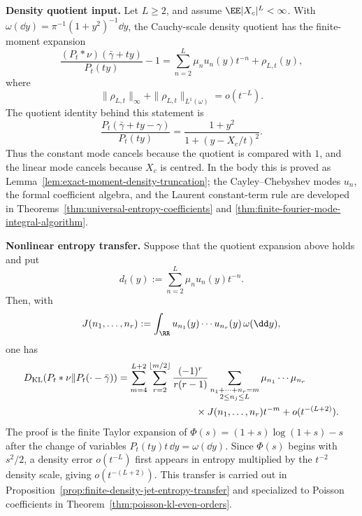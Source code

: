 \medskip
\noindent\textbf{Density quotient input.}
Let \(L\ge2\), and assume \(\EE|X_c|^L<\infty\).  With
\(\omega(\dd y)=\pi^{-1}(1+y^2)^{-1}\dd y\), the Cauchy-scale density
quotient has the finite-moment expansion
\begin{equation}\label{eq:guide-theorem-a-density-quotient}
\frac{(P_t*\nu)(\bar{\gamma}+ty)}{P_t(ty)}-1
=
\sum_{n=2}^{L}\mu_nu_n(y)t^{-n}+\rho_{L,t}(y),
\end{equation}
where
\begin{equation}\label{eq:guide-theorem-a-density-remainder}
\|\rho_{L,t}\|_\infty+\|\rho_{L,t}\|_{L^1(\omega)}=o(t^{-L}).
\end{equation}
The quotient identity behind this statement is
\[
\frac{P_t(\bar{\gamma}+ty-\gamma)}{P_t(ty)}
=\frac{1+y^2}{1+(y-X_c/t)^2}.
\]
Thus the constant mode cancels because the quotient is compared with \(1\),
and the linear mode cancels because \(X_c\) is centred.  In the body this is
proved as Lemma~\ref{lem:exact-moment-density-truncation}; the
Cayley--Chebyshev modes \(u_n\), the formal coefficient algebra, and the
Laurent constant-term rule are developed in
Theorems~\ref{thm:universal-entropy-coefficients} and
\ref{thm:finite-fourier-mode-integral-algorithm}.

\medskip
\noindent\textbf{Nonlinear entropy transfer.}
Suppose that the quotient expansion above holds and put
\[
d_t(y):=\sum_{n=2}^{L}\mu_nu_n(y)t^{-n}.
\]
Then, with
\[
J(n_1,\ldots,n_r):=
\int_{\RR}u_{n_1}(y)\cdots u_{n_r}(y)\,\omega(\dd y),
\]
one has
\begin{equation}\label{eq:guide-theorem-b-entropy-transfer}
\begin{split}
D_{\rm KL}(P_t*\nu\|P_t(\cdot-\bar{\gamma}))
&=
\sum_{m=4}^{L+2}
\sum_{r=2}^{\lfloor m/2\rfloor}
\frac{(-1)^r}{r(r-1)}
\sum_{\substack{n_1+\cdots+n_r=m\\ 2\le n_j\le L}}
\mu_{n_1}\cdots\mu_{n_r} \\
&\qquad\qquad\qquad\qquad
{}\times J(n_1,\ldots,n_r)t^{-m}
+o(t^{-(L+2)}).
\end{split}
\end{equation}
The proof is the finite Taylor expansion of
\(\Phi(s)=(1+s)\log(1+s)-s\) after the change of variables
\(P_t(ty)t\,\dd y=\omega(\dd y)\).  Since \(\Phi(s)\) begins with
\(s^2/2\), a density error \(o(t^{-L})\) first appears in entropy multiplied
by the \(t^{-2}\) density scale, giving \(o(t^{-(L+2)})\).  This transfer is
carried out in Proposition~\ref{prop:finite-density-jet-entropy-transfer}
and specialized to Poisson coefficients in
Theorem~\ref{thm:poisson-kl-even-orders}.

